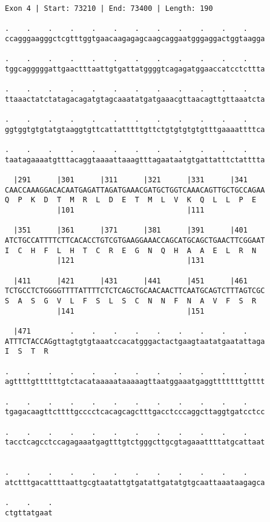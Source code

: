 \documentclass{article}
\begin{document}
\begin{Verbatim}
Exon 4 | Start: 73210 | End: 73400 | Length: 190
 
.    .    .    .    .    .    .    .    .    .    .    .    
ccagggaagggctcgtttggtgaacaagagagcaagcaggaatgggaggactggtaagga
  
.    .    .    .    .    .    .    .    .    .    .    .    
tggcagggggattgaactttaattgtgattatggggtcagagatggaaccatcctcttta
  
.    .    .    .    .    .    .    .    .    .    .    .    
ttaaactatctatagacagatgtagcaaatatgatgaaacgttaacagttgttaaatcta
  
.    .    .    .    .    .    .    .    .    .    .    .    
ggtggtgtgtatgtaaggtgttcattatttttgttctgtgtgtgtgtttgaaaattttca
  
.    .    .    .    .    .    .    .    .    .    .    .    
taatagaaaatgtttacaggtaaaattaaagtttagaataatgtgattatttctatttta
  
  |291      |301      |311      |321      |331      |341    
CAACCAAAGGACACAATGAGATTAGATGAAACGATGCTGGTCAAACAGTTGCTGCCAGAA
Q  P  K  D  T  M  R  L  D  E  T  M  L  V  K  Q  L  L  P  E  
            |101                          |111              
  
  |351      |361      |371      |381      |391      |401    
ATCTGCCATTTTCTTCACACCTGTCGTGAAGGAAACCAGCATGCAGCTGAACTTCGGAAT
I  C  H  F  L  H  T  C  R  E  G  N  Q  H  A  A  E  L  R  N  
            |121                          |131              
  
  |411      |421      |431      |441      |451      |461    
TCTGCCTCTGGGGTTTTATTTTCTCTCAGCTGCAACAACTTCAATGCAGTCTTTAGTCGC
S  A  S  G  V  L  F  S  L  S  C  N  N  F  N  A  V  F  S  R  
            |141                          |151              
  
  |471         .    .    .    .    .    .    .    .    .    
ATTTCTACCAGgttagtgtgtaaatccacatgggactactgaagtaatatgaatattaga
I  S  T  R                                                  
  
.    .    .    .    .    .    .    .    .    .    .    .    
agttttgttttttgtctacataaaaataaaaagttaatggaaatgaggtttttttgtttt
  
.    .    .    .    .    .    .    .    .    .    .    .    
tgagacaagttcttttgcccctcacagcagctttgacctcccaggcttaggtgatcctcc
  
.    .    .    .    .    .    .    .    .    .    .    .    
tacctcagcctccagagaaatgagtttgtctgggcttgcgtagaaattttatgcattaat
  
  
.    .    .    .    .    .    .    .    .    .    .    .    
atctttgacattttaattgcgtaatattgtgatattgatatgtgcaattaaataagagca
  
.    .    .
ctgttatgaat
\end{Verbatim}
\end{document}
